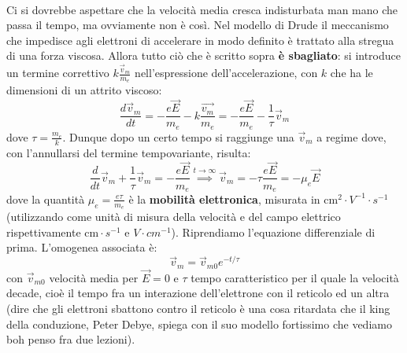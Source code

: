 \documentclass{book}
\begin{document}
         \paragraph{}
            Ci si dovrebbe aspettare che la velocità media cresca indisturbata man mano che passa il tempo, ma ovviamente non è così. Nel modello di Drude il meccanismo che impedisce agli elettroni di accelerare in modo definito è trattato alla stregua di una forza viscosa. Allora tutto ciò che è scritto sopra \textbf{è sbagliato}: si introduce un termine correttivo $\displaystyle k\frac{\vec{v}_{m}}{m_{e}}$ nell'espressione dell'accelerazione, con $k$ che ha le dimensioni di un attrito viscoso:
            $$\frac{d\vec{v}_{m}}{dt} = - \frac{e\vec{E}}{m_{e}} - k \frac{\vec{v_{m}}}{m_{e}} = -\frac{e\vec{E}}{m_{e}}-\frac{1}{\tau}\vec{v}_{m}$$
            dove $\displaystyle \tau = \frac{m_{e}}{k}$. Dunque dopo un certo tempo si raggiunge una $\vec{v}_{m}$ a regime dove, con l'annullarsi del termine tempovariante, risulta:
            $$\frac{d}{dt}\vec{v}_{m} + \frac{1}{\tau} \vec{v}_{m} = - \frac{e\vec{E}}{m_{e}} \stackrel{t \to \infty}{\implies} \vec{v}_{m} = - \tau\frac{e\vec{E}}{m_{e}} = - \mu_{e} \vec{E}$$
            dove la quantità $\displaystyle \mu_{e} = \frac{e \tau}{m_{e}}$ è la \textbf{mobilità elettronica}, misurata in $\textrm{cm}^{2}\cdot V^{-1} \cdot s^{-1}$ (utilizzando come unità di misura della velocità e del campo elettrico rispettivamente $\textrm{cm} \cdot s^{-1}$ e $V \cdot cm^{-1}$).
            Riprendiamo l'equazione differenziale di prima. L'omogenea associata è:
            $$\vec{v}_{m} = \vec{v}_{m0} e^{-t/\tau}$$
            con $\vec{v}_{m0}$ velocità media per $\vec{E} =0$ e $\tau$ tempo caratteristico per il quale la velocità decade, cioè il tempo fra un interazione dell'elettrone con il reticolo ed un altra (dire che gli elettroni sbattono contro il reticolo è una cosa ritardata che il king della conduzione, Peter Debye, spiega con il suo modello fortissimo che vediamo boh penso fra due lezioni).
\end{document}
